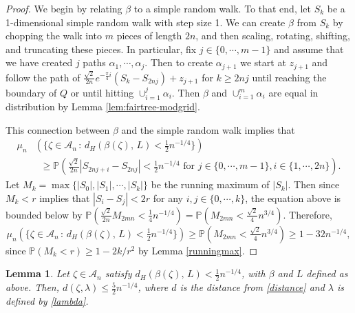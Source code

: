 \documentclass[preprint,12pt]{elsarticle}
\newtheorem{lemma}[theorem]{Lemma}
\theoremstyle{definition}
\theoremstyle{remark}
\numberwithin{equation}{section}
\begin{document}
\begin{proof}
We begin by relating $\beta$ to a simple random walk.  To that end, let $S_k$ be a 1-dimensional simple random walk with step size 1.
We can create $\beta$ from $S_k$ by chopping the walk into $m$ pieces of length $2n$, and then scaling, rotating, shifting, and truncating these pieces.  In particular, fix $j \in \{0, \cdots, m-1\}$ and 
assume that we have created $j$ paths $\alpha_1, \cdots, \alpha_{j}$.  
Then to create $\alpha_{j+1}$ we start at $z_{j+1}$ and follow the path of $\frac{\sqrt{2}}{2n}e^{-\frac{\pi}{4}i}(S_k-S_{2nj}) +z_{j+1}$ for $k \geq 2nj$ until reaching the boundary of $Q$ or until hitting $\cup_{i =1}^j\alpha_{i}$.  
Then
$\beta$ and $ \cup_{i=1}^m \alpha_i$ are equal in distribution by Lemma \ref{lem:fairtree-modgrid}. 

 
 This connection between $\beta$ and the simple random walk implies that
 \begin{align*}
  \mu_n &\left( \Big\{ \zeta \in  \mathcal{A}_n  \, : \, d_H\left(\beta(\zeta), \, L \right) < \tfrac{1}{2} n^{-1/4} \Big\} \right) \\
       &\;\; \geq  \mathbb{P}\left( \tfrac{\sqrt{2}}{2n} |S_{2nj+i} - S_{2nj}| < \tfrac{1}{2} n^{-1/4} \text{ for } j \in \{ 0, \cdots, m-1\}, i \in \{1, \cdots, 2n \}\right). 
  \end{align*}
  Let $M_k = \max\{ |S_0|, |S_1|, \cdots, |S_k|\}$ be the running maximum of $|S_k|$.
 Then since $M_k < r$ implies that $|S_i-S_j| <2 r$ for any $i,j \in \{0, \cdots, k\}$, the equation above is bounded below by       
     $ \mathbb{P}\left(\tfrac{\sqrt{2}}{2n} M_{2mn} < \tfrac{1}{4} n^{-1/4} \right) 
      = \mathbb{P}\left( M_{2mn} < \tfrac{\sqrt{2}}{4} n^{3/4} \right)$.
Therefore,
  \begin{equation*} 
    \mu_n \left( \Big\{ \zeta \in  \mathcal{A}_n  \, : \, d_H\left(\beta(\zeta), \, L \right)      < \tfrac{1}{2} n^{-1/4} \Big\} \right)   
            \geq \mathbb{P}\left( M_{2mn} < \tfrac{\sqrt{2}}{4} n^{3/4} \right) 
            \geq 1-32n^{-1/4},
 \end{equation*}
 since $\mathbb{P}(M_k < r) \geq 1-2k/r^2$ by Lemma \ref{runningmax}.
\end{proof}







\begin{lemma} \label{closetolambda}
Let $\zeta \in  \mathcal{A}_n $ satisfy $d_H\left(\beta(\zeta), \, L \right) < \tfrac{1}{2} n^{-1/4}$, with $\beta$ and $L$ defined as above.
Then, $d(\zeta, \lambda) \leq \frac{5}{2}n^{-1/4}$,
where $d$ is the distance from \eqref{distance} and $\lambda$ is defined by \eqref{lambda}.
\end{lemma}
\end{document}
